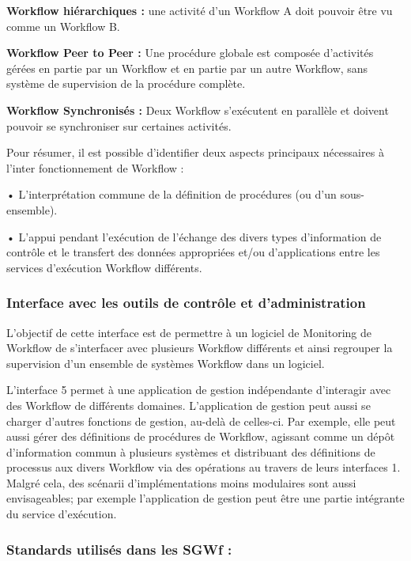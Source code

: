 \textbf{ Workflow hiérarchiques :} une activité d’un Workflow A doit pouvoir être vu comme un
 Workflow B. 
 
 \textbf{Workflow Peer to Peer :} Une procédure globale est composée d’activités gérées en partie par un Workflow et en partie par un autre Workflow, sans système de supervision de
 la procédure complète. 
 
 \textbf{Workflow Synchronisés :} Deux Workflow s’exécutent en parallèle et doivent pouvoir se
 synchroniser sur certaines activités. 
 
 Pour résumer, il est possible d’identifier deux aspects principaux nécessaires à
 l’inter fonctionnement de Workflow :

 • L’interprétation commune de la définition de procédures (ou d’un sous-ensemble).
 
 • L’appui pendant l'exécution de l’échange des divers types d'information de contrôle et
 le transfert des données appropriées et/ou d'applications entre les services d’exécution Workflow différents.
 
 \subsubsection{Interface avec les outils de contrôle et d’administration }


L’objectif de cette interface est de permettre à un logiciel de Monitoring de Workflow de
s’interfacer avec plusieurs Workflow différents et ainsi regrouper la supervision d’un ensemble de systèmes Workflow dans un logiciel.


L'interface 5 permet à une application de gestion indépendante d’interagir avec des
Workflow de différents domaines. L'application de gestion peut aussi se charger d'autres fonctions de gestion, au-delà de celles-ci. Par exemple, elle peut aussi gérer des définitions de procédures de Workflow, agissant comme un dépôt d’information commun à plusieurs systèmes
et distribuant des définitions de processus aux divers Workflow via des opérations au travers
de leurs interfaces 1.
Malgré cela, des scénarii d’implémentations moins modulaires sont aussi envisageables;
par exemple l'application de gestion peut être une partie intégrante du service d’exécution.  
 
 
 
 
\subsubsection{Standards utilisés dans les SGWf :}

